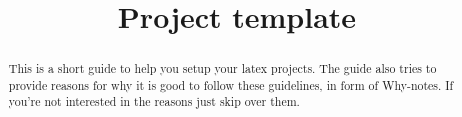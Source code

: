 \documentclass[letterpaper]{article}
\title{Project template}
\begin{document}
\maketitle	

\begin{abstract}
This is a short guide to help you setup your latex projects. The guide also tries to provide reasons for why it is good to follow these guidelines, in form of Why-notes. If you're not interested in the reasons just skip over them.
\end{abstract}
\tableofcontents
	
	
	
	
	
	
	

	

\end{document}
